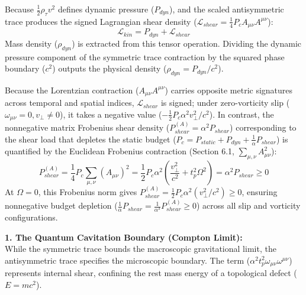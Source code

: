 Because $\frac{1}{2}\rho_\tau v^2$ defines dynamic pressure ($P_{dyn}$), and the scaled antisymmetric trace produces the signed Lagrangian shear density ($\mathcal{L}_{shear} = \frac{1}{4}P_c A_{\mu\nu}A^{\mu\nu}$): %
\begin{equation}
    \mathcal{L}_{kin} = P_{dyn} + \mathcal{L}_{shear} \label{eq:kinematic_lagrangian_trace} %
\end{equation}
Mass density ($\rho_{dyn}$) is extracted from this tensor operation. Dividing the dynamic pressure component of the symmetric trace contraction by the squared phase boundary ($c^2$) outputs the physical density ($\rho_{dyn} = P_{dyn}/c^2$).

Because the Lorentzian contraction ($A_{\mu\nu}A^{\mu\nu}$) carries opposite metric signatures across temporal and spatial indices, $\mathcal{L}_{shear}$ is signed; under zero-vorticity slip ($\omega_{\mu\nu} = 0, v_\perp \neq 0$), it takes a negative value ($-\frac{1}{2}P_c \alpha^2 v_\perp^2 / c^2$). 
In contrast, the nonnegative matrix Frobenius shear density ($P_{shear}^{(A)} = \alpha^2 P_{shear}$) corresponding to the shear load that depletes the static budget ($P_c = P_{static} + P_{dyn} + \frac{1}{\alpha}P_{shear}$) is quantified by the Euclidean Frobenius contraction (Section 6.1, $\sum_{\mu,\nu} A_{\mu\nu}^2$): %
\begin{equation} 
    P_{shear}^{(A)} = \frac{1}{4} P_c \sum_{\mu,\nu} (A_{\mu\nu})^2 = \frac{1}{2} P_c \alpha^2 \left( \frac{v_\perp^2}{c^2} + t_p^2 \Omega^2 \right) = \alpha^2 P_{shear} \ge 0 \label{eq:frobenius_shear_load} %
\end{equation} 
At $\Omega = 0$, this Frobenius norm gives $P_{shear}^{(A)} = \frac{1}{2} P_c \alpha^2 (v_\perp^2 / c^2) \ge 0$, ensuring nonnegative budget depletion ($\frac{1}{\alpha}P_{shear} = \frac{1}{\alpha^3}P_{shear}^{(A)} \ge 0$) across all slip and vorticity configurations. %

\textbf{1. The Quantum Cavitation Boundary (Compton Limit):} \\
While the symmetric trace bounds the macroscopic gravitational limit, the antisymmetric trace specifies the microscopic boundary. The term ($\alpha^2 t_p^2 \omega_{\mu\nu}\omega^{\mu\nu}$) represents internal shear, confining the rest mass energy of a topological defect ($E = mc^2$). 

